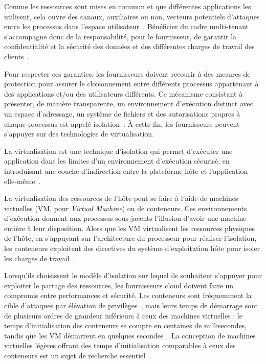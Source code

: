 Comme les ressources sont mises en commun et que différentes applications les utilisent, cela ouvre des canaux, auxiliaires ou non, vecteurs potentiels d'attaques entre les processus dans l'espace utilisateur~\cite{pedersen2017trash, wu2018side}. Bénéficier du cadre multi-tenant s'accompagne donc de la responsabilité, pour le fournisseur, de garantir la confidentialité et la sécurité des données et des différentes charges de travail des clients~\cite{vaqueroLockingSkySurvey2011}.

Pour respecter ces garanties, les fournisseurs doivent recourir à des mesures de protection pour assurer le cloisonnement entre différents processus appartenant à des applications et/ou des utilisateurs différents. Ce mécanisme consistant à présenter, de manière transparente, un environnement d'exécution distinct avec un espace d'adressage, un système de fichiers et des autorisations propres à chaque processus est appelé isolation~\cite{fehlingCloudComputingPatterns2014}. À cette fin, les fournisseurs peuvent s'appuyer sur des technologies de virtualisation.

La virtualisation est une technique d'isolation qui permet d'exécuter une application dans les limites d'un environnement d'exécution sécurisé, en introduisant une couche d'indirection entre la plateforme hôte et l'application elle-même~\cite{singhviAtollScalableLowLatency2021}.

La virtualisation des ressources de l'hôte peut se faire à l'aide de machines virtuelles (\gls{VM}, pour \textit{Virtual Machine}) ou de conteneurs. Ces environnements d'exécution donnent aux processus sous-jacents l'illusion d'avoir une machine entière à leur disposition. Alors que les \gls{VM} virtualisent les ressources physiques de l'hôte, en s'appuyant sur l'architecture du processeur pour réaliser l'isolation, les conteneurs exploitent des directives du système d'exploitation hôte pour isoler les charges de travail~\cite{mancoMyVMLighter2017}.

Lorsqu'ils choisissent le modèle d'isolation sur lequel ils souhaitent s'appuyer pour exploiter le partage des ressources, les fournisseurs cloud doivent faire un compromis entre performances et sécurité. Les conteneurs sont fréquemment la cible d'attaques par élévation de privilèges~\cite{zomer2022containers, redhat2019containers}, mais leurs temps de démarrage sont de plusieurs ordres de grandeur inférieurs à ceux des machines virtuelles : le temps d'initialisation des conteneurs se compte en centaines de millisecondes, tandis que les \gls{VM} démarrent en quelques secondes~\cite{mancoMyVMLighter2017}. La conception de machines virtuelles légères offrant des temps d'initialisation comparables à ceux des conteneurs est un sujet de recherche essentiel~\cite{agacheFirecrackerLightweightVirtualization, Anjali2020BlendingCA}.

